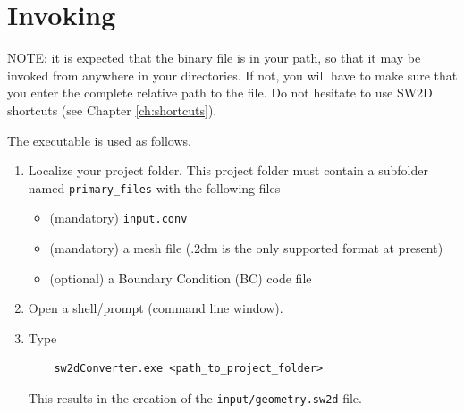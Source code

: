 \section{Invoking \swConverter}
NOTE: it is expected that the binary file \swConverter is in your path, so that it may be invoked from anywhere in your directories. If not, you will have to make sure that you enter the complete relative path to the \swConverter file. Do not hesitate to use SW2D shortcuts (see Chapter \ref{ch:shortcuts}).

The \swConverter executable is used as follows.

\begin{enumerate}
	\item Localize your project folder. This project folder must contain a subfolder named \texttt{primary\_files} with the following files
	\begin{itemize}
		\item (mandatory) \texttt{input.conv}
		\item (mandatory) a mesh file (.2dm is the only supported format at present)
		\item (optional) a Boundary Condition (BC) code file
	\end{itemize}
	\item Open a shell/prompt (command line window).
	\item Type
	\begin{verbatim}
	sw2dConverter.exe <path_to_project_folder>
	\end{verbatim}
	This results in the creation of the \texttt{input/geometry.sw2d} file.
	
	
\end{enumerate}
